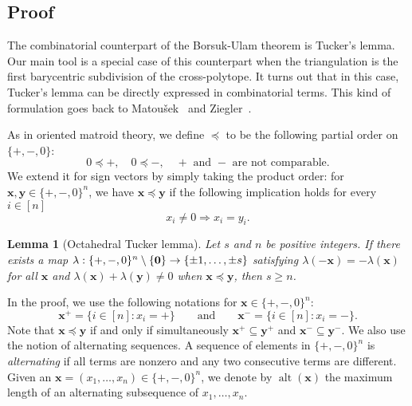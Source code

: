 \documentclass[12pt]{amsart}
\newtheorem{lemma}{Lemma}
\theoremstyle{remark}
\def\zero{{\bf 0}}
\def\x{\boldsymbol{x}}
\def\y{\boldsymbol{y}}
\def\alt{\operatorname{alt}}
\begin{document}


\subsection{Proof}

The combinatorial counterpart of the Borsuk-Ulam theorem is Tucker's lemma. Our main tool is a special case of this counterpart when the triangulation is the first barycentric subdivision of the cross-polytope. It turns out that in this case, Tucker's lemma can be directly expressed in combinatorial terms. This kind of formulation goes back to Matou\v{s}ek~\cite{matouvsek2004combinatorial} and Ziegler~\cite{ziegler2002generalized}.


As in oriented matroid theory, we define $\preceq$ to be the following partial order on $\{+,-,0\}$: $$0\preceq +,\quad 0\preceq -,\quad+\mbox{ and }-\mbox{ are not comparable.}$$ We extend it for sign vectors by simply taking the product order: for $\x,\y\in\{+,-,0\}^n$, we have $\x\preceq\y$ if the following implication holds for every $i\in[n]$
$$x_i\neq 0\Longrightarrow x_i=y_i.$$ 


\begin{lemma}[Octahedral Tucker lemma]\label{lem:oct_tucker}
Let $s$ and $n$ be positive integers. If there exists a map $\lambda:\{+,-,0\}^n\setminus \{\zero\} \rightarrow\{\pm 1,\ldots,\pm s\}$
 satisfying $\lambda(-\x)=-\lambda(\x)$ for all $\x$ and $\lambda(\x)+\lambda(\y)\neq 0$ when $\x\preceq\y$, then $s\geq n$.
\end{lemma}

In the proof, we use the following notations for $\x\in\{+,-,0\}^n$:
$$\x^+=\{i\in[n]\colon x_i=+\}\qquad\mbox{and}\qquad\x^-=\{i\in[n]\colon x_i=-\}.$$  Note that $\x\preceq\y$ if and only if simultaneously $\x^+\subseteq\y^+$ and $\x^-\subseteq\y^-$. We also use the notion of alternating sequences. A sequence of elements in $\{+,-,0\}^n$ is {\em alternating} if all terms are nonzero and any two consecutive terms are different. Given an $\x=(x_1,\ldots,x_n)\in\{+,-,0\}^n$, we denote by $\alt(\x)$ the maximum length of an alternating subsequence of $x_1,\ldots,x_n$.
\end{document}
